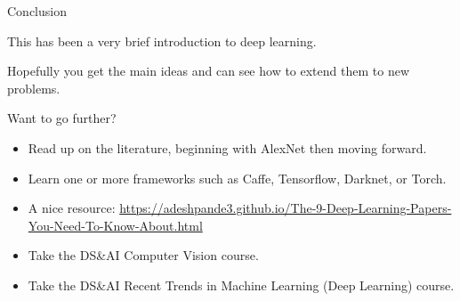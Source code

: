 \documentclass{beamer}
\begin{document}
\begin{frame}{Conclusion}

  This has been a very brief introduction to deep learning.

  \medskip

  Hopefully you get the main ideas and can see how to extend them to
  new problems.

  \medskip

  Want to go further?
  \begin{itemize}
  \item Read up on the literature, beginning with AlexNet then moving forward.
  \item Learn one or more frameworks such as Caffe, Tensorflow,
    Darknet, or Torch.
  \item A nice resource: \url{https://adeshpande3.github.io/The-9-Deep-Learning-Papers-You-Need-To-Know-About.html}
  \item Take the DS\&AI Computer Vision course.
  \item Take the DS\&AI Recent Trends in Machine Learning (Deep
    Learning) course.
  \end{itemize}

\end{frame}
\end{document}
